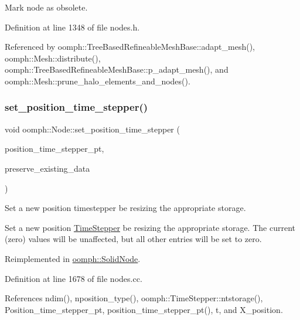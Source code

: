 Mark node as obsolete. 



Definition at line 1348 of file nodes.\+h.



Referenced by oomph\+::\+Tree\+Based\+Refineable\+Mesh\+Base\+::adapt\+\_\+mesh(), oomph\+::\+Mesh\+::distribute(), oomph\+::\+Tree\+Based\+Refineable\+Mesh\+Base\+::p\+\_\+adapt\+\_\+mesh(), and oomph\+::\+Mesh\+::prune\+\_\+halo\+\_\+elements\+\_\+and\+\_\+nodes().

\mbox{\label{classoomph_1_1Node_a15d3962d66d92de44e32edc9c5c2fedf}} 
\subsubsection{\texorpdfstring{set\+\_\+position\+\_\+time\+\_\+stepper()}{set\_position\_time\_stepper()}}
{\footnotesize\ttfamily void oomph\+::\+Node\+::set\+\_\+position\+\_\+time\+\_\+stepper (\begin{DoxyParamCaption}\item[{\hyperlink{classoomph_1_1TimeStepper}{Time\+Stepper} $\ast$const \&}]{position\+\_\+time\+\_\+stepper\+\_\+pt,  }\item[{const bool \&}]{preserve\+\_\+existing\+\_\+data }\end{DoxyParamCaption})\hspace{0.3cm}{\ttfamily [virtual]}}



Set a new position timestepper be resizing the appropriate storage. 

Set a new position \hyperlink{classoomph_1_1TimeStepper}{Time\+Stepper} be resizing the appropriate storage. The current (zero) values will be unaffected, but all other entries will be set to zero. 

Reimplemented in \hyperlink{classoomph_1_1SolidNode_a12b206264401d5b2ff6aefff386bdca4}{oomph\+::\+Solid\+Node}.



Definition at line 1678 of file nodes.\+cc.



References ndim(), nposition\+\_\+type(), oomph\+::\+Time\+Stepper\+::ntstorage(), Position\+\_\+time\+\_\+stepper\+\_\+pt, position\+\_\+time\+\_\+stepper\+\_\+pt(), t, and X\+\_\+position.

